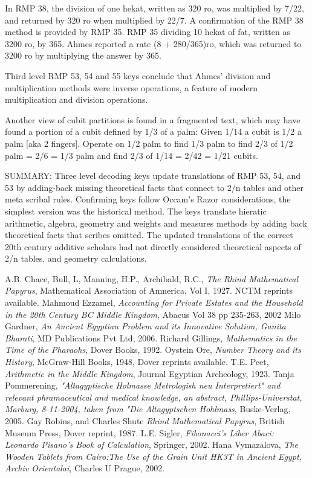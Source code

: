 \documentclass[12pt]{article}
\begin{document}
In RMP 38, the division of one hekat, written as 320 ro, was multiplied by 7/22, and returned by 320 ro when multiplied by 22/7. A confirmation of the RMP 38 method is provided by RMP 35. RMP 35 dividing 10 hekat of fat, written as 3200 ro, by 365. Ahmes reported a rate (8 + 280/365)ro, which was returned to 3200 ro by multiplying the answer by 365.

Third level RMP 53, 54 and 55 keys conclude that Ahmes' division and multiplication methods were inverse operations, a feature of modern multiplication and division operations.

Another view of cubit partitions is found in a fragmented text, which may have found a portion of a cubit defined by 1/3 of a palm: Given 1/14 a cubit is 1/2 a palm [aka 2 fingers]. Operate on 1/2 palm to find 1/3 palm to find 2/3 of 1/2 palm = 2/6 = 1/3 palm and find 2/3 of 1/14 = 2/42 = 1/21 cubits.

SUMMARY: Three level decoding keys update translations of RMP 53, 54, and 53 by adding-back missing theoretical facts that connect to 2/n tables and other meta scribal rules. Confirming keys follow Occam's Razor considerations, the simplest version was the historical method. The keys translate hieratic arithmetic, algebra, geometry and weights and measures methods by adding back theoretical facts that scribes omitted. The updated translations of the  correct 20th century additive scholars had not directly considered theoretical aspects of 2/n tables, and geometry calculations.

\begin{thebibliography}{10}
  A.B. Chace, Bull, L, Manning, H.P., Archibald, R.C., \emph{The Rhind Mathematical Papyrus}, Mathematical Association of Amnerica, Vol I, 1927. NCTM reprints available.
 Mahmoud Ezzamel, \emph{Accounting for Private Estates and the Household in the 20th Century BC Middle Kingdom}, Abacus Vol 38 pp 235-263, 2002
 Milo Gardner, \emph{An Ancient Egyptian Problem and its Innovative Solution, Ganita Bharati}, MD Publications Pvt Ltd, 2006.
Richard Gillings, \emph{Mathematics in the Time of the Pharaohs}, Dover Books, 1992.
 Oystein Ore, \emph{Number Theory and its History}, McGraw-Hill Books, 1948, Dover reprints available.
 T.E. Peet, \emph{Arithmetic in the Middle Kingdom}, Journal Egyptian Archeology, 1923.
 Tanja Pommerening, \emph{"Altagyptische Holmasse Metrologish neu Interpretiert" and relevant phramaceutical and medical knowledge, an abstract,  Phillips-Universtat, Marburg, 8-11-2004, taken from "Die Altagyptschen Hohlmass}, Buske-Verlag, 2005.
 Gay Robins, and Charles Shute \emph{Rhind Mathematical Papyrus}, British Museum Press, Dover reprint, 1987.
 L.E. Sigler, \emph{Fibonacci's Liber Abaci: Leonardo Pisano's Book of Calculation}, Springer, 2002.
 Hana Vymazalova, \emph{The Wooden Tablets from Cairo:The Use of the Grain Unit HK3T in Ancient Egypt, Archiv Orientalai}, Charles U Prague, 2002.
\end{thebibliography}




\end{document}
